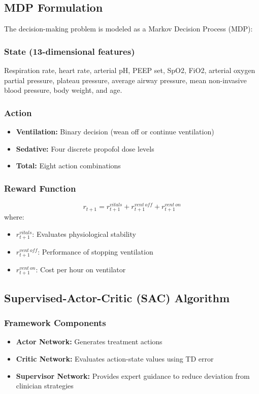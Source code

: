 \subsection*{MDP Formulation}
The decision-making problem is modeled as a Markov Decision Process (MDP):

\subsubsection*{State (13-dimensional features)}
Respiration rate, heart rate, arterial pH, PEEP set, SpO2, FiO2, arterial oxygen partial pressure, plateau pressure, average airway pressure, mean non-invasive blood pressure, body weight, and age.

\subsubsection*{Action}
\begin{itemize}
    \item \textbf{Ventilation:} Binary decision (wean off or continue ventilation)
    \item \textbf{Sedative:} Four discrete propofol dose levels
    \item \textbf{Total:} Eight action combinations
\end{itemize}

\subsubsection*{Reward Function}
\begin{equation}
r_{t+1} = r^{vitals}_{t+1} + r^{vent\ off}_{t+1} + r^{vent\ on}_{t+1}
\end{equation}
where:
\begin{itemize}
    \item $r^{vitals}_{t+1}$: Evaluates physiological stability
    \item $r^{vent\ off}_{t+1}$: Performance of stopping ventilation
    \item $r^{vent\ on}_{t+1}$: Cost per hour on ventilator
\end{itemize}

\subsection*{Supervised-Actor-Critic (SAC) Algorithm}

\subsubsection*{Framework Components}
\begin{itemize}
    \item \textbf{Actor Network:} Generates treatment actions
    \item \textbf{Critic Network:} Evaluates action-state values using TD error
    \item \textbf{Supervisor Network:} Provides expert guidance to reduce deviation from clinician strategies
\end{itemize}

